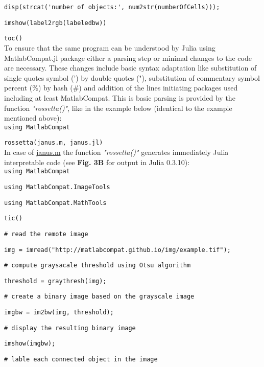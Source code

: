 \verb|disp(strcat('number of objects:', num2str(numberOfCells)));|

\verb|imshow(label2rgb(labeledbw))|

\verb|toc()|\\



To ensure that the same program can be understood by Julia using MatlabCompat.jl package either a parsing step or minimal changes to the code are necessary. These changes include basic syntax adaptation like substitution of single quotes symbol (') by double quotes ("), substitution of commentary symbol percent (\%) by hash (\#) and addition of the lines initiating packages used including at least MatlabCompat. This is basic parsing is provided by the function \textit{"rossetta()"}, like in the example below (identical to the example mentioned above):\\



\verb|using MatlabCompat|

\verb|rossetta(janus.m, janus.jl)|\\



In case of \href{https://github.com/MatlabCompat/MatlabCompat.jl/blob/dev/test/janus.m}{janus.m} the function \textit{"rossetta()"} generates immediately Julia interpretable code (see \textbf{Fig. 3B} for output in Julia 0.3.10):\\



\verb|using MatlabCompat|

\verb|using MatlabCompat.ImageTools|

\verb|using MatlabCompat.MathTools|

\verb|tic()|

\verb|# read the remote image|

\verb|img = imread("http://matlabcompat.github.io/img/example.tif");|

\verb|# compute graysacale threshold using Otsu algorithm|

\verb|threshold = graythresh(img);|

\verb|# create a binary image based on the grayscale image|

\verb|imgbw = im2bw(img, threshold);|

\verb|# display the resulting binary image|

\verb|imshow(imgbw);|

\verb|# lable each connected object in the image|

